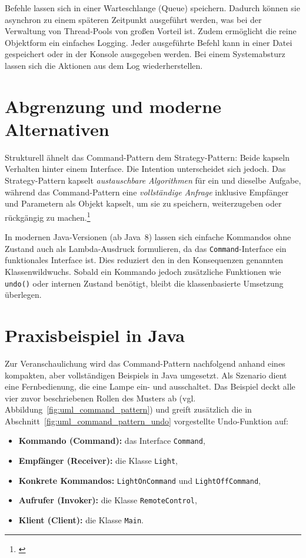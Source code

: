 \documentclass[12pt,a4paper]{article}
\begin{document}
    Befehle lassen sich in einer Warteschlange (Queue) speichern. Dadurch können sie asynchron zu einem späteren Zeitpunkt
    ausgeführt werden, was bei der Verwaltung von Thread-Pools von großen Vorteil ist. Zudem ermöglicht die reine Objektform ein einfaches Logging.
    Jeder ausgeführte Befehl kann in einer Datei gespeichert oder in der Konsole ausgegeben werden. Bei einem Systemabsturz lassen sich
    die Aktionen aus dem Log wiederherstellen.

    \section{Abgrenzung und moderne Alternativen}

    Strukturell ähnelt das Command-Pattern dem Strategy-Pattern: Beide kapseln Verhalten hinter einem Interface.
    Die Intention unterscheidet sich jedoch. Das Strategy-Pattern kapselt \textit{austauschbare Algorithmen} für
    ein und dieselbe Aufgabe, während das Command-Pattern eine \textit{vollständige Anfrage} inklusive Empfänger
    und Parametern als Objekt kapselt, um sie zu speichern, weiterzugeben oder rückgängig zu machen.\footnote{\cite{gamma1995design}}

    In modernen Java-Versionen (ab Java~8) lassen sich einfache Kommandos ohne Zustand auch als Lambda-Ausdruck
    formulieren, da das \texttt{Command}-Interface ein funktionales Interface ist. Dies reduziert den in den
    Konsequenzen genannten Klassenwildwuchs. Sobald ein Kommando jedoch zusätzliche Funktionen wie \texttt{undo()}
    oder internen Zustand benötigt, bleibt die klassenbasierte Umsetzung überlegen.

    \section{Praxisbeispiel in Java}

    Zur Veranschaulichung wird das Command-Pattern nachfolgend anhand eines kompakten, aber vollständigen Beispiels
    in Java umgesetzt. Als Szenario dient eine Fernbedienung, die eine Lampe ein- und ausschaltet. Das Beispiel deckt
    alle vier zuvor beschriebenen Rollen des Musters ab (vgl. Abbildung~\ref{fig:uml_command_pattern}) und greift
    zusätzlich die in Abschnitt~\ref{fig:uml_command_pattern_undo} vorgestellte Undo-Funktion auf:

    \begin{itemize}
        \item \textbf{Kommando (Command):} das Interface \texttt{Command},
        \item \textbf{Empfänger (Receiver):} die Klasse \texttt{Light},
        \item \textbf{Konkrete Kommandos:} \texttt{LightOnCommand} und \texttt{LightOffCommand},
        \item \textbf{Aufrufer (Invoker):} die Klasse \texttt{RemoteControl},
        \item \textbf{Klient (Client):} die Klasse \texttt{Main}.
    \end{itemize}
\end{document}
